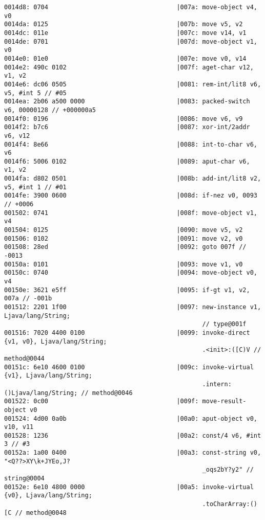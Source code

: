 \begin{lstlisting}
0014d8: 0704                                   |007a: move-object v4, v0
0014da: 0125                                   |007b: move v5, v2
0014dc: 011e                                   |007c: move v14, v1
0014de: 0701                                   |007d: move-object v1, v0
0014e0: 01e0                                   |007e: move v0, v14
0014e2: 490c 0102                              |007f: aget-char v12, v1, v2
0014e6: dc06 0505                              |0081: rem-int/lit8 v6, v5, #int 5 // #05
0014ea: 2b06 a500 0000                         |0083: packed-switch v6, 00000128 // +000000a5
0014f0: 0196                                   |0086: move v6, v9
0014f2: b7c6                                   |0087: xor-int/2addr v6, v12
0014f4: 8e66                                   |0088: int-to-char v6, v6
0014f6: 5006 0102                              |0089: aput-char v6, v1, v2
0014fa: d802 0501                              |008b: add-int/lit8 v2, v5, #int 1 // #01
0014fe: 3900 0600                              |008d: if-nez v0, 0093 // +0006
001502: 0741                                   |008f: move-object v1, v4
001504: 0125                                   |0090: move v5, v2
001506: 0102                                   |0091: move v2, v0
001508: 28ed                                   |0092: goto 007f // -0013
00150a: 0101                                   |0093: move v1, v0
00150c: 0740                                   |0094: move-object v0, v4
00150e: 3621 e5ff                              |0095: if-gt v1, v2, 007a // -001b
001512: 2201 1f00                              |0097: new-instance v1, Ljava/lang/String;
                                                      // type@001f
001516: 7020 4400 0100                         |0099: invoke-direct {v1, v0}, Ljava/lang/String;
                                                      .<init>:([C)V // method@0044
00151c: 6e10 4600 0100                         |009c: invoke-virtual {v1}, Ljava/lang/String;
                                                      .intern:()Ljava/lang/String; // method@0046
001522: 0c00                                   |009f: move-result-object v0
001524: 4d00 0a0b                              |00a0: aput-object v0, v10, v11
001528: 1236                                   |00a2: const/4 v6, #int 3 // #3
00152a: 1a00 0400                              |00a3: const-string v0, "<Q??>XY\k+JYEo,J?
                                                      _oqs2bY?y2" // string@0004
00152e: 6e10 4800 0000                         |00a5: invoke-virtual {v0}, Ljava/lang/String;
                                                      .toCharArray:()[C // method@0048

\end{lstlisting}
